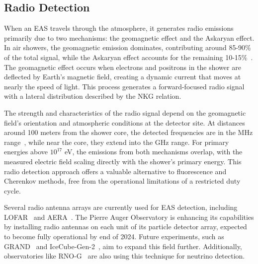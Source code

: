\subsection{Radio Detection}
\label{sec:EAS_rad}
When an \gls*{EAS} travels through the atmosphere, it generates radio emissions primarily due to two mechanisms: the geomagnetic effect and the Askaryan effect. In air showers, the geomagnetic emission dominates, contributing around 85-90\% of the total signal, while the Askaryan effect accounts for the remaining 10-15\%~\cite{1966RSPSA.289..206K, Askaryan:1961pfb, osti_4100652}. The geomagnetic effect occurs when electrons and positrons in the shower are deflected by Earth's magnetic field, creating a dynamic current that moves at nearly the speed of light. This process generates a forward-focused radio signal with a lateral distribution described by the NKG relation.

The strength and characteristics of the radio signal depend on the geomagnetic field's orientation and atmospheric conditions at the detector site. At distances around 100 meters from the shower core, the detected frequencies are in the MHz range~\cite{Huege_2016}, while near the core, they extend into the GHz range. For primary energies above \(10^{17}\) eV, the emissions from both mechanisms overlap, with the measured electric field scaling directly with the shower's primary energy. This radio detection approach offers a valuable alternative to fluorescence and Cherenkov methods, free from the operational limitations of a restricted duty cycle.

Several radio antenna arrays are currently used for EAS detection, including LOFAR~\cite{2013A&A...556A...2V} and AERA~\cite{PhysRevD.93.122005}. The Pierre Auger Observatory is enhancing its capabilities by installing radio antennas on each unit of its particle detector array, expected to become fully operational by end of 2024. Future experiments, such as GRAND~\cite{fang2017giantradioarrayneutrino} and IceCube-Gen-2~\cite{Aartsen_2021_Gen-2}, aim to expand this field further. Additionally, observatories like RNO-G~\cite{Aguilar_2021} are also using this technique for neutrino detection. 


